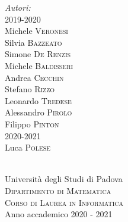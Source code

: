 \documentclass[12pt,a4paper,headings=optiontohead,openany]{scrbook}
\begin{document}
\begin{titlepage}
\begin{minipage}{0.4\textwidth}
\begin{flushleft} \large
\emph{\Large{Autori:}}\\
2019-2020\\
\quad \quad Michele \textsc{Veronesi}\\
\quad \quad Silvia \textsc{Bazzeato}\\
\quad \quad Simone \textsc{De Renzis}\\
\quad \quad Michele \textsc{Baldisseri}\\
\quad \quad Andrea \textsc{Cecchin}\\
\quad \quad Stefano \textsc{Rizzo}\\
\quad \quad Leonardo \textsc{Tredese}\\
\quad \quad Alessandro \textsc{Pirolo}\\
\quad \quad Filippo \textsc{Pinton}\\
2020-2021\\
\quad \quad Luca \textsc{Polese}\\
\end{flushleft}

\end{minipage}\\[2cm]


\LARGE Università degli Studi di Padova\\[0.4cm]
\textsc{\large Dipartimento di Matematica}\\[0.05cm]
\textsc{\large Corso di Laurea in Informatica}\\[1cm] 
{\Large Anno accademico 2020 - 2021}\\[1cm] 

\vfill %

\end{titlepage}
\end{document}
